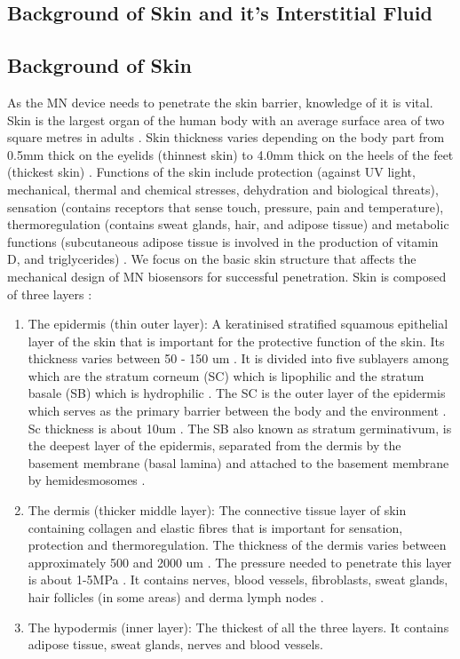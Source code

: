 \onecolumn 
\begin{appendices}
\section{Background of Skin and it's Interstitial Fluid}
\label{Appendix_A}
\subsection{Background of Skin}
As the MN device needs to penetrate the skin barrier, knowledge of it is vital. Skin is the largest organ of the human body with an average surface area of two square metres in adults \cite{brown2021histology}. Skin thickness varies depending on the body part from 0.5mm thick on the eyelids (thinnest skin) to 4.0mm thick on the heels of the feet (thickest skin) \cite{brown2021histology}. Functions of the skin include protection (against UV light, mechanical, thermal and chemical stresses, dehydration and biological threats), sensation (contains receptors that sense touch, pressure, pain and temperature), thermoregulation (contains sweat glands, hair, and adipose tissue) and metabolic functions (subcutaneous adipose tissue is involved in the production of vitamin D, and triglycerides) \cite{brown2021histology}. We focus on the basic skin structure that affects the mechanical design of MN biosensors for successful penetration. Skin is composed of three layers \cite{brown2021histology,GARCIAGUZMAN2021116148}:
\begin{enumerate}
    \item The epidermis (thin outer layer): A keratinised stratified squamous epithelial layer of the skin that is important for the protective function of the skin. Its thickness varies between 50 - 150 um \cite{GARCIAGUZMAN2021116148}. It is divided into five sublayers \cite{brown2021histology} among which are the stratum corneum (SC) which is lipophilic and the stratum basale (SB) which is hydrophilic \cite{GARCIAGUZMAN2021116148}. The SC is the outer layer of the epidermis which serves as the primary barrier between the body and the environment \cite{brown2021histology}. Sc thickness is about 10um \cite{GARCIAGUZMAN2021116148}. The SB also known as stratum germinativum, is the deepest layer of the epidermis, separated from the dermis by the basement membrane (basal lamina) and attached to the basement membrane by hemidesmosomes \cite{brown2021histology}.
    \item The dermis (thicker middle layer): The connective tissue layer of skin containing collagen and elastic fibres that is important for sensation, protection and thermoregulation. The thickness of the dermis varies between approximately 500 and 2000 um \cite{GARCIAGUZMAN2021116148}. The pressure needed to penetrate this layer is about 1-5MPa \cite{smalls2006effect}. It contains nerves, blood vessels, fibroblasts, sweat glands, hair follicles (in some areas) and derma lymph nodes \cite{GARCIAGUZMAN2021116148,brown2021histology}. 
    \item The hypodermis (inner layer): The thickest of all the three layers. It contains adipose tissue, sweat glands, nerves and blood vessels. 
\end{enumerate}

\end{appendices}
